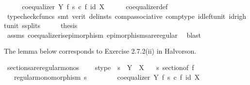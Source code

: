 \begin{isabellebody}
\ \ \isamarkupfalse%
\ \isamarkupfalse%
\ {\isachardoublequoteopen}coequalizer\ Y\ f\ {\isacharparenleft}{\kern0pt}s\ {\isasymcirc}\isactrlsub c\ f{\isacharparenright}{\kern0pt}\ {\isacharparenleft}{\kern0pt}id\ X{\isacharparenright}{\kern0pt}{\isachardoublequoteclose}\isanewline
\ \ \ \ \isamarkupfalse%
\ coequalizer{\isacharunderscore}{\kern0pt}def\ \isanewline
\ \ \ \ \isamarkupfalse%
\ {\isacharparenleft}{\kern0pt}typecheck{\isacharunderscore}{\kern0pt}cfuncs{\isacharcomma}{\kern0pt}\ smt\ {\isacharparenleft}{\kern0pt}verit{\isacharcomma}{\kern0pt}\ del{\isacharunderscore}{\kern0pt}insts{\isacharparenright}{\kern0pt}\ comp{\isacharunderscore}{\kern0pt}associative{}\ comp{\isacharunderscore}{\kern0pt}type\ id{\isacharunderscore}{\kern0pt}left{\isacharunderscore}{\kern0pt}unit{}\ id{\isacharunderscore}{\kern0pt}right{\isacharunderscore}{\kern0pt}unit{}\ s{\isacharunderscore}{\kern0pt}splits{\isacharparenright}{\kern0pt}\isanewline
\ \ \isamarkupfalse%
\ \isamarkupfalse%
\ {\isacharquery}{\kern0pt}thesis\isanewline
\ \ \ \ \isamarkupfalse%
\ assms\ coequalizer{\isacharunderscore}{\kern0pt}is{\isacharunderscore}{\kern0pt}epimorphism\ epimorphisms{\isacharunderscore}{\kern0pt}are{\isacharunderscore}{\kern0pt}regular\ \isamarkupfalse%
\ blast\isanewline
{}\isamarkupfalse%
%
\endisatagproof
{\isafoldproof}%
%
\isadelimproof
%
\endisadelimproof
%
\begin{isamarkuptext}%
The lemma below corresponds to Exercise 2.7.2(ii) in Halvorson.%
\end{isamarkuptext}\isamarkuptrue%
\isamarkupfalse%
\ sections{\isacharunderscore}{\kern0pt}are{\isacharunderscore}{\kern0pt}regular{\isacharunderscore}{\kern0pt}monos{\isacharcolon}{\kern0pt}\ \isanewline
\ \ \ s{\isacharunderscore}{\kern0pt}type{\isacharcolon}{\kern0pt}\ \ {\isachardoublequoteopen}s\ {\isacharcolon}{\kern0pt}\ Y\ {\isasymrightarrow}\ X{\isachardoublequoteclose}\isanewline
\ \ \ {\isachardoublequoteopen}s\ sectionof\ f{\isachardoublequoteclose}\isanewline
\ \ \ {\isachardoublequoteopen}regular{\isacharunderscore}{\kern0pt}monomorphism\ s{\isachardoublequoteclose}\isanewline
%
\isadelimproof
%
\endisadelimproof
%
\isatagproof
{}\isamarkupfalse%
\ {\isacharminus}{\kern0pt}\ \ \ \isanewline
\ \ \isamarkupfalse%
\ {\isachardoublequoteopen}coequalizer\ Y\ f\ {\isacharparenleft}{\kern0pt}s\ {\isasymcirc}\isactrlsub c\ f{\isacharparenright}{\kern0pt}\ {\isacharparenleft}{\kern0pt}id\ X{\isacharparenright}{\kern0pt}{\isachardoublequoteclose}\isanewline

\end{isabellebody}
